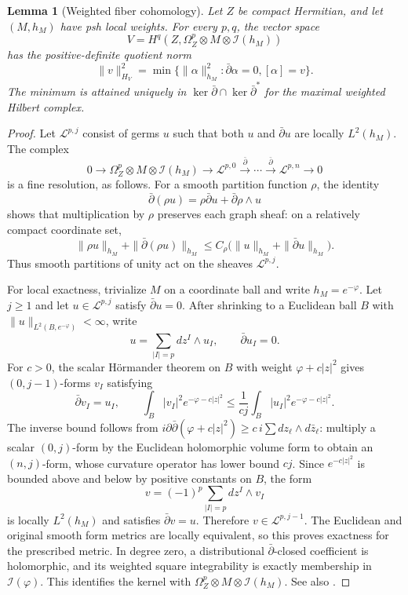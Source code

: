 \documentclass[11pt,reqno]{amsart}
\numberwithin{equation}{section}
\newtheorem{lemma}[theorem]{Lemma}
\theoremstyle{definition}
\theoremstyle{remark}
\begin{document}
\begin{lemma}[Weighted fiber cohomology]\label{prop:fiber-norm}
Let $Z$ be compact Hermitian, and let $(M,h_M)$ have psh local weights.
For every $p,q$, the vector space
\[
 V=H^q(Z,\Omega_Z^p\otimes M\otimes\mathcal I(h_M))
\]
has the positive-definite quotient norm
\begin{equation}\label{eq:weighted-quotient}
 \|v\|_{H_V}^2
 =\min\{\|\alpha\|_{h_M}^2:\bar\partial\alpha=0, [\alpha]=v\}.
\end{equation}
The minimum is attained uniquely in
$\ker\bar\partial\cap\ker\bar\partial^*$ for the maximal weighted
Hilbert complex.
\end{lemma}
\begin{proof}
Let $\mathscr L^{p,j}$ consist of germs $u$ such that both $u$ and
$\bar\partial u$ are locally $L^2(h_M)$.  The complex
\begin{equation}\label{eq:weighted-resolution}
 0\longrightarrow\Omega_Z^p\otimes M\otimes\mathcal I(h_M)
 \longrightarrow\mathscr L^{p,0}\xrightarrow{\bar\partial}
 \cdots\xrightarrow{\bar\partial}\mathscr L^{p,n}\longrightarrow0
\end{equation}
is a fine resolution, as follows.  For a smooth partition function
$\rho$, the identity
\[
 \bar\partial(\rho u)=\rho\bar\partial u+\bar\partial\rho\wedge u
\]
shows that multiplication by $\rho$ preserves each graph sheaf:
on a relatively compact coordinate set,
\[
 \|\rho u\|_{h_M}+\|\bar\partial(\rho u)\|_{h_M}
 \le C_\rho\bigl(\|u\|_{h_M}+\|\bar\partial u\|_{h_M}\bigr).
\]
Thus smooth partitions of unity act on the sheaves
$\mathscr L^{p,j}$.

For local exactness, trivialize $M$ on a coordinate ball and write
$h_M=e^{-\varphi}$.  Let $j\ge1$ and let
$u\in\mathscr L^{p,j}$ satisfy $\bar\partial u=0$.
After shrinking to a Euclidean ball $B$ with
$\|u\|_{L^2(B,e^{-\varphi})}<\infty$, write
\[
 u=\sum_{|I|=p}dz^I\wedge u_I,\qquad
 \bar\partial u_I=0.
\]
For $c>0$, the scalar H\"ormander theorem on $B$ with weight
$\varphi+c|z|^2$ gives $(0,j-1)$-forms $v_I$ satisfying
\[
 \bar\partial v_I=u_I,\qquad
 \int_B|v_I|^2e^{-\varphi-c|z|^2}
 \le\frac1{cj}\int_B|u_I|^2e^{-\varphi-c|z|^2}.
\]
The inverse bound follows from
$i\partial\bar\partial(\varphi+c|z|^2)\ge
c\,i\sum dz_\ell\wedge d\bar z_\ell$: multiply a scalar
$(0,j)$-form by the Euclidean holomorphic volume form to obtain
an $(n,j)$-form, whose curvature operator has lower bound $cj$.
Since $e^{-c|z|^2}$ is bounded above and below by positive constants
on $B$, the form
\[
 v=(-1)^p\sum_{|I|=p}dz^I\wedge v_I
\]
is locally $L^2(h_M)$ and satisfies $\bar\partial v=u$.
Therefore $v\in\mathscr L^{p,j-1}$.
The Euclidean and original smooth form metrics are locally
equivalent, so this proves exactness for the prescribed metric.
In degree zero, a distributional $\bar\partial$-closed coefficient
is holomorphic, and its weighted square integrability is exactly
membership in $\mathcal I(\varphi)$.  This identifies the kernel
with $\Omega_Z^p\otimes M\otimes\mathcal I(h_M)$.
See also \cite[Theorem 5.3(a)]{WatNadel}.


\end{proof}
\end{document}
